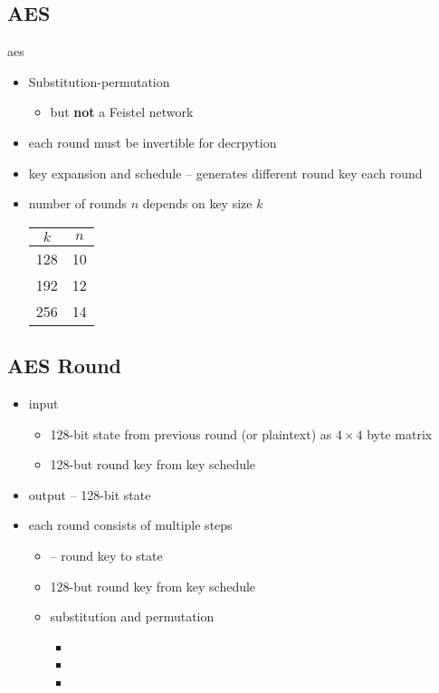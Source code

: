 \documentclass[draft]{article}
\begin{document}
\subsection{AES}
\acrfull{aes}
\begin{itemize}[nosep]
    \item Substitution-permutation
          \begin{itemize}[nosep]\item but \textbf{not} a Feistel network\end{itemize}
    \item each round must be invertible for decrpytion
    \item key expansion and schedule -- generates different round key each round
    \item number of rounds $n$ depends on key size $k$

          \begin{tabular}{cc}
              $k$ & $n$ \\\toprule
              128 & 10  \\
              192 & 12  \\
              256 & 14  \\\bottomrule
          \end{tabular}
\end{itemize}
\subsection{AES Round}
\begin{itemize}[nosep]
    \item input
          \begin{itemize}[nosep]
              \item 128-bit state from previous round (or plaintext) as $4\times4$ byte matrix
              \item 128-but round key from key schedule
          \end{itemize}
    \item output -- 128-bit state
    \item each round consists of multiple steps
          \begin{itemize}[nosep]
              \item {} --  round key to state
              \item 128-but round key from key schedule
              \item substitution and permutation
                    \begin{itemize}[nosep]
                        \item {}
                        \item {}
                        \item {}
                    \end{itemize}
          \end{itemize}
\end{itemize}
\end{document}
